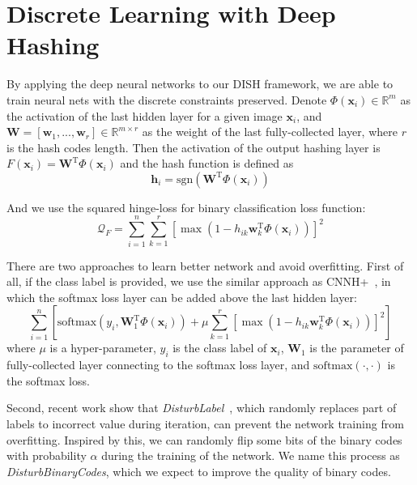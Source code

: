 \documentclass[conference]{IEEEtran}
\begin{document}
\section{Discrete Learning with Deep Hashing}
\label{sec:deephashing}

By applying the deep neural networks to our DISH framework, we are able to train neural nets with the discrete constraints preserved. Denote $\Phi (\mathbf{x}_i) \in \mathbb{R}^m$ as the activation of the last hidden layer for a given image $\mathbf{x}_i$, and $\mathbf{W} = [\mathbf{w}_1,...,\mathbf{w}_r] \in \mathbb{R}^{m \times r}$ as the weight of the last fully-collected layer, where $r$ is the hash codes length. Then the activation of the output hashing layer is $F(\mathbf{x}_i)=\mathbf{W}^\mathrm{T} \Phi (\mathbf{x}_i)$ and the hash function is defined as
\begin{equation}
\mathbf{h}_i=\mathrm{sgn}(\mathbf{W}^\mathrm{T} \Phi (\mathbf{x}_i))
\end{equation}

And we use the squared hinge-loss for binary classification loss function:
\begin{equation}
\mathcal{Q}_F=\sum_{i=1}^n \sum_{k=1}^r [\max (1-h_{ik} \mathbf{w}^\mathrm{T}_k \Phi (\mathbf{x}_i))]^2
\end{equation}

There are two approaches to learn better network and avoid overfitting. First of all, if the class label is provided, we use the similar approach as CNNH+~\cite{xia2014supervised}, in which the softmax loss layer can be added above the last hidden layer:
\begin{equation}
\sum_{i=1}^n[\mathrm{softmax}(y_i, \mathbf{W}^\mathrm{T}_1 \Phi(\mathbf{x}_i)) + \mu \sum_{k=1}^r [\max (1-h_{ik} \mathbf{w}^\mathrm{T}_k \Phi (\mathbf{x}_i))]^2]
\end{equation}
where $\mu$ is a hyper-parameter, $y_i$ is the class label of $\mathbf{x}_i$, $\mathbf{W}_1$ is the parameter of fully-collected layer connecting to the softmax loss layer, and $\mathrm{softmax}(\cdot, \cdot)$ is the softmax loss.

Second, recent work show that {\em DisturbLabel}~\cite{xie2016disturblabel}, which randomly replaces part of labels to incorrect value during iteration, can prevent the network training from overfitting. Inspired by this, we can randomly flip some bits of the binary codes with probability $\alpha$ during the training of the network. We name this process as {\em DisturbBinaryCodes}, which we expect to improve the quality of binary codes.
\end{document}
